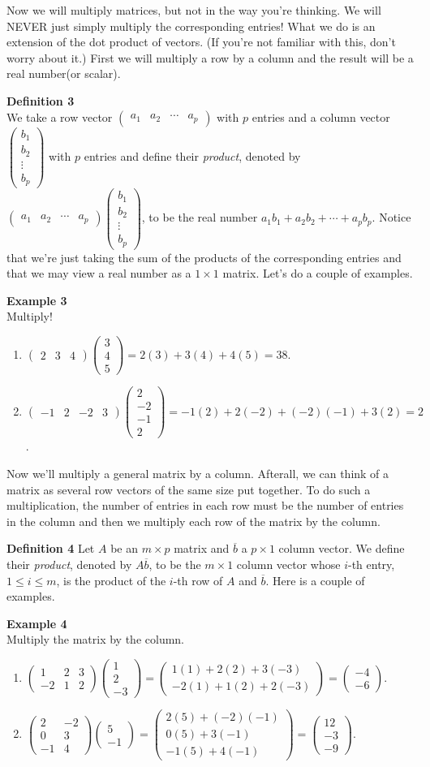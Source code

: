 \documentclass[12pt]{article}
\def\it{\item}
\def\be{\begin{enumerate}} \def\ee{\end{enumerate}}
\def\bar#1{\overline{#1}}
\def\coll#1#2{\begin{pmatrix} #1 \\ #2 \end{pmatrix}}
\def\colll#1#2#3{\begin{pmatrix} #1 \\ #2 \\ #3 \end{pmatrix}}
\def\collll#1#2#3#4{\begin{pmatrix} #1 \\ #2 \\ #3 \\ #4 \end{pmatrix}}
\def\colp#1{\begin{pmatrix} #1_1 \\ #1_2 \\ \vdots \\ #1_p \end{pmatrix}}
\def\rowp#1{\begin{pmatrix} #1_1 & #1_2 & \cdots & #1_p \end{pmatrix}}
\def\rowww#1#2#3{\begin{pmatrix} #1 & #2 & #3 \end{pmatrix}}
\def\rowwww#1#2#3#4{\begin{pmatrix} #1 & #2 & #3 & #4 \end{pmatrix}}
\begin{document}
Now we will multiply matrices, but not in the way you're thinking. We will NEVER just simply multiply the corresponding entries! What we do is an extension of the dot product of vectors. (If you're not familiar with this, don't worry about it.) First we will multiply a row by a column and the result will be a real number(or scalar).

\newpage

\noindent
{\bf Definition 3} \\
We take a row vector $\rowp{a}$ with $p$ entries and a column vector $\colp{b}$ with $p$ entries and define their {\itshape product}, denoted by 
$\rowp{a} \colp{b}$, to be the real number $a_1 b_1 + a_2 b_2 + \cdots + a_p b_p$. Notice that we're just taking the sum of the products of the corresponding entries and that we may view a real number as a $1 \times 1$ matrix. Let's do a couple of examples. 

\noindent
{\bf Example 3} \\
Multiply! 
\be
\it $\rowww{2}{3}{4} \colll{3}{4}{5} = 2(3) + 3(4) + 4(5) = 38$.
\it $\rowwww{-1}{2}{-2}{3} \collll{2}{-2}{-1}{2} = -1(2) + 2(-2) + (-2)(-1) + 3(2) = 2$.
\ee

Now we'll multiply a general matrix by a column. Afterall, we can think of a matrix as several row vectors of the same size put together. To do such a multiplication, the number of entries in each row must be the number of entries in the column and then we multiply each row of the matrix by the column. 

\noindent
{\bf Definition 4}
Let $A$ be an $m \times p$ matrix and $\bar{b}$ a $p \times 1$ column vector. We define their {\itshape product}, denoted by $A\bar{b}$, to be the $m \times 1$ column vector whose $i$-th entry, $1 \leq i \leq m$, is the product of the $i$-th row of $A$ and $\bar{b}$. Here is a couple of examples. 

\noindent
{\bf Example 4} \\
Multiply the matrix by the column.
\be
\it $\begin{pmatrix} 1 & 2 & 3 \\ -2 & 1 & 2 \end{pmatrix} \colll{1}{2}{-3} = \coll{1(1)+2(2)+3(-3)}{-2(1)+1(2)+2(-3)} = \coll{-4}{-6}$.
\it $\begin{pmatrix} 2 & -2 \\ 0 & 3 \\ -1 & 4 \end{pmatrix} \coll{5}{-1} = \colll{2(5)+(-2)(-1)}{0(5)+3(-1)}{-1(5)+4(-1)} = \colll{12}{-3}{-9}$.
\ee
\end{document}
